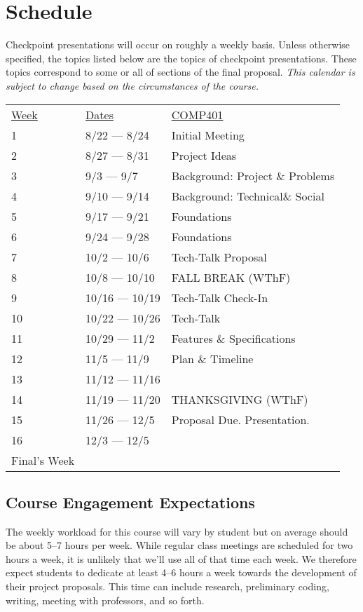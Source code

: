 \documentclass[10pt]{article}
\begin{document}
\section{Schedule}


 Checkpoint presentations will occur on roughly a weekly basis. Unless otherwise specified, the topics listed below are the topics of checkpoint presentations. These topics correspond to some or all of sections of the final proposal. \textit{This calendar is subject to change based on the circumstances of the course.}

\begin{center}
\begin{tabular}{lll}
\underline{Week} & \underline{Dates} &  \underline{COMP401} \\
1 & 8/22 --- 8/24 & Initial Meeting   \\
2 & 8/27 --- 8/31 & Project Ideas   \\
3 & 9/3 --- 9/7 & Background: Project \& Problems   \\
4 & 9/10 --- 9/14 & Background: Technical\& Social    \\
5 & 9/17 --- 9/21 & Foundations  \\
6 & 9/24 --- 9/28 & Foundations   \\
7 & 10/2 --- 10/6 & Tech-Talk Proposal  \\
8 & 10/8 --- 10/10 & FALL BREAK (WThF)  \\
9 & 10/16 --- 10/19 & Tech-Talk Check-In   \\
10 & 10/22 --- 10/26 & Tech-Talk  \\
11 & 10/29 --- 11/2 &  Features \& Specifications   \\
12 & 11/5 --- 11/9 & Plan \& Timeline  \\
13 & 11/12 --- 11/16 &   \\
14 & 11/19 --- 11/20  & THANKSGIVING (WThF) \\
15 & 11/26 --- 12/5 & Proposal Due. Presentation.  \\
16 & 12/3 --- 12/5 &  \\
Final's Week &  &    \\
\end{tabular}
\end{center}


\subsection{Course Engagement Expectations}

The weekly workload for this course will vary by student but on average should be about 5--7 hours per week.  While regular class meetings are scheduled for two hours a week, it is unlikely that we'll use all of that time each week.  We therefore expect students to dedicate at least 4--6 hours a week towards the development of their project proposals.  This time can include research, preliminary coding, writing, meeting with professors, and so forth.
\end{document}
